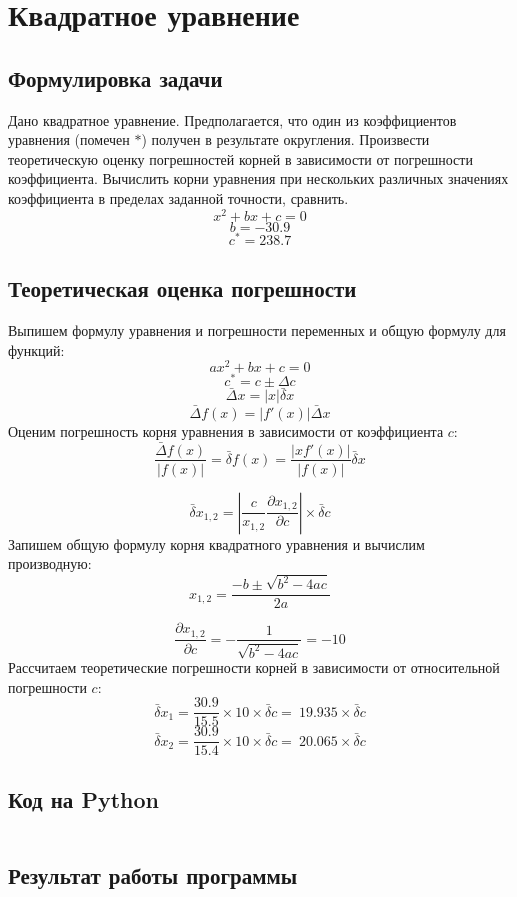\documentclass[a4paper,12pt]{article}
\newenvironment{longlisting}{\captionsetup{type=listing}}{}
\begin{document}
\section{Квадратное уравнение}
\subsection{Формулировка задачи}
Дано квадратное уравнение. Предполагается, что один из коэффициентов уравнения (помечен $*$) получен в результате округления. Произвести теоретическую оценку погрешностей корней в зависимости от погрешности коэффициента. Вычислить корни уравнения при нескольких различных значениях коэффициента в пределах заданной точности, сравнить.
$$x^2+bx+c = 0$$
$$b = -30.9$$
$$c^* = 238.7 $$
    
\subsection{Теоретическая оценка погрешности}

Выпишем формулу уравнения и погрешности переменных и общую формулу для функций:
$$ax^2 + bx + c = 0$$
$$c^* = c \pm \Delta c$$
$$\bar{\Delta} x = |x| \bar{\delta} x$$
$$\bar{\Delta} f(x) = |f'(x)| \bar{\Delta} x$$
Оценим погрешность корня уравнения в зависимости от коэффициента $c$:
$$\frac{\bar{\Delta} f(x)}{|f(x)|} = \bar{\delta} f(x) = \frac{|xf'(x)|}{|f(x)|}\bar{\delta}x$$

$$\bar{\delta} x_{1,2} = |\frac{c}{x_{1,2}} \frac{\partial x_{1,2}}{\partial c} | \times \bar{\delta} c$$
Запишем общую формулу корня квадратного уравнения и вычислим производную:
$$x_{1,2} = \frac{-b \pm \sqrt{b^2-4ac}}{2a} $$

$$\frac{\partial x_{1,2}}{\partial c} = -\frac{1}{\sqrt{b^2-4ac}} = -10$$
Рассчитаем теоретические погрешности корней в зависимости от относительной погрешности $c$:
$$\bar{\delta} x_{1} = \frac{30.9}{15.5} \times 10 \times \bar{\delta} c = ~19.935 \times \bar{\delta} c $$
$$\bar{\delta} x_{2} = \frac{30.9}{15.4} \times 10 \times \bar{\delta} c = ~20.065 \times \bar{\delta} c$$
   
\subsection{Код на Python}
\begin{longlisting}
\inputminted{python}{quadratic_eq.py}
\end{longlisting}

\subsection{Результат работы программы}
\begin{longlisting}

\end{longlisting}
\end{document}
